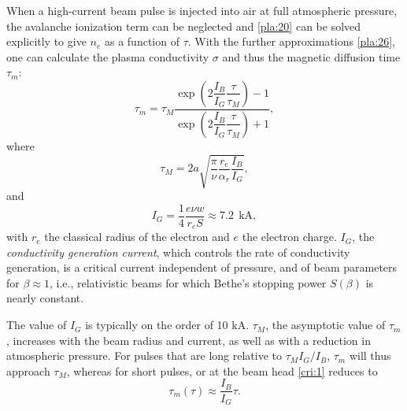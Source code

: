 \documentclass [12pt,a4paper,     ]{report} %
\begin{document}
When a high-current beam pulse is injected into air at full atmospheric pressure, the avalanche ionization term can be neglected and \eqref{pla:20} can be solved explicitly to give $n_e$ as a function of $\tau$.  With the further approximations \eqref{pla:26}, one can calculate the plasma conductivity $\sigma$ and thus the magnetic diffusion time $\tau_m$:
%
\begin{equation}\label{cri:1} %
    \tau_m = \tau_M \frac{\exp(2\dfrac{I_B}{I_G}\dfrac{\tau}{\tau_M})-1}
                         {\exp(2\dfrac{I_B}{I_G}\dfrac{\tau}{\tau_M})+1},
\end{equation}
%
where
%
\begin{equation}\label{cri:2} %
    \tau_M = 2 a \sqrt{ \frac{\pi}{\nu} \frac{r_e}{\alpha_r} \frac{I_B}{I_G} },
\end{equation}
%
and
%
\begin{equation}\label{cri:3} %
     I_G = \frac{1}{4} \frac{e\nu w}{r_e S} \approx 7.2 ~~ \text{kA},
\end{equation}
%
with $r_e$ the classical radius of the electron and $e$ the electron charge.  $I_G$, the \emph{conductivity generation current}, which controls the rate of conductivity generation, is a critical current independent of pressure, and of beam parameters for $\beta \approx 1$, i.e., relativistic beams for which Bethe's stopping power $S(\beta)$ is nearly constant.

 The value of $I_G$ is typically on the order of 10 kA.  $\tau_M$, the asymptotic value of $\tau_m$, increases  with the beam radius and current, as well as with a reduction in atmospheric pressure.  For pulses that are long relative to $\tau_M I_G/I_B$, $\tau_m$ will thus approach $\tau_M$, whereas for short pulses, or at the beam head \eqref{cri:1} reduces to
%
\begin{equation}\label{cri:4} %
               \tau_m(\tau) \approx \frac{I_B}{I_G} \tau.
\end{equation}
%
\end{document}
